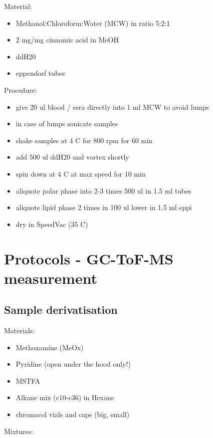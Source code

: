 \documentclass[]{book}
\providecommand{\tightlist}{%
  \setlength{\itemsep}{0pt}\setlength{\parskip}{0pt}}
\theoremstyle{definition}
\theoremstyle{definition}
\theoremstyle{definition}
\theoremstyle{remark}
\begin{document}
Material:

\begin{itemize}
\tightlist
\item
  Methanol:Chloroform:Water (MCW) in ratio 5:2:1
\item
  2 mg/mg cinnamic acid in MeOH
\item
  ddH20
\item
  eppendorf tubes
\end{itemize}

Procedure:

\begin{itemize}
\tightlist
\item
  give 20 ul blood / sera directly into 1 ml MCW to avoid lumps
\item
  in case of lumps sonicate samples
\item
  shake samples at 4 C for 800 rpm for 60 min
\item
  add 500 ul ddH20 and vortex shortly
\item
  spin down at 4 C at max speed for 10 min
\item
  aliquote polar phase into 2-3 times 500 ul in 1.5 ml tubes
\item
  aliquote lipid phase 2 times in 100 ul lower in 1.5 ml eppi
\item
  dry in SpeedVac (35 C)
\end{itemize}

\chapter{Protocols - GC-ToF-MS
measurement}\label{protocols---gc-tof-ms-measurement}

\section{Sample derivatisation}\label{sample-derivatisation}

Materials:

\begin{itemize}
\tightlist
\item
  Methoxamine (MeOx)
\item
  Pyridine (open under the hood only!)
\item
  MSTFA
\item
  Alkane mix (c10-c36) in Hexane
\item
  chromacol vials and caps (big, small)
\end{itemize}

Mixtures:
\end{document}
